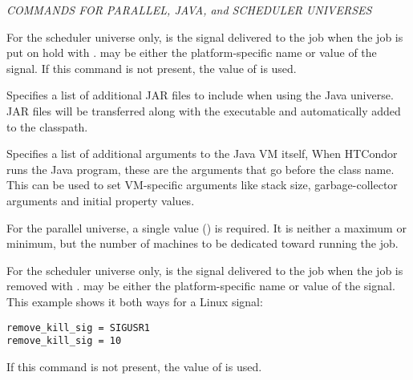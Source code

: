 \emph{COMMANDS FOR PARALLEL, JAVA, and SCHEDULER UNIVERSES}
\begin{description} 


\label{condor-submit-hold-kill-sig}
\item[hold\_kill\_sig = $<$signal-number$>$] For the scheduler universe only,
 is the signal delivered
to the job when the job is put on hold
with .
 may be either the platform-specific name or value
of the signal.
If this command is not present,
the value of  is used.



\label{condor-submit-jar-files}
\item[jar\_files = $<$file\_list$>$]
Specifies a list of additional JAR files to include when using
the Java universe.  JAR files will be transferred along with
the executable and automatically added to the classpath.


\label{condor-submit-java-vm-args}
\item[java\_vm\_args = $<$argument\_list$>$]
Specifies a list of additional arguments to the Java VM itself,
When HTCondor runs the Java program, these are the arguments that 
go before the class name.  This can be used to set VM-specific 
arguments like stack size, garbage-collector arguments 
and initial property values.


\label{condor-submit-machine-count}
\item[machine\_count = $<$max$>$] 
For the parallel universe,
a single value () is required.
It is neither a maximum or minimum, but 
the number of machines to be dedicated toward running the job.


\label{condor-submit-remove-kill-sig}
\item[remove\_kill\_sig = $<$signal-number$>$] For the scheduler universe only,
 is the signal delivered
to the job when the job is removed
with .
 may be either the platform-specific name or value
of the signal.
This example shows it both ways for a Linux signal:
\begin{verbatim}
remove_kill_sig = SIGUSR1
remove_kill_sig = 10
\end{verbatim}
If this command is not present,
the value of  is used.

\end{description} 

